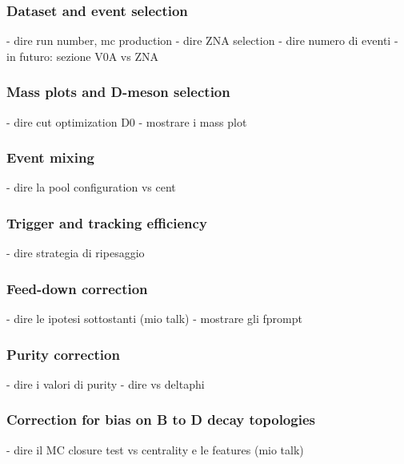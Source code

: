 \subsubsection{Dataset and event selection}
- dire run number, mc production
- dire ZNA selection
- dire numero di eventi
- in futuro: sezione V0A vs ZNA

\subsubsection{Mass plots and D-meson selection}
- dire cut optimization D0
- mostrare i mass plot

\subsubsection{Event mixing}
- dire la pool configuration vs cent

\subsubsection{Trigger and tracking efficiency}
- dire strategia di ripesaggio

\subsubsection{Feed-down correction}
- dire le ipotesi sottostanti (mio talk)
- mostrare gli fprompt

\subsubsection{Purity correction}
- dire i valori di purity
- dire vs deltaphi

\subsubsection{Correction for bias on B to D decay topologies}
- dire il MC closure test vs centrality e le features (mio talk)